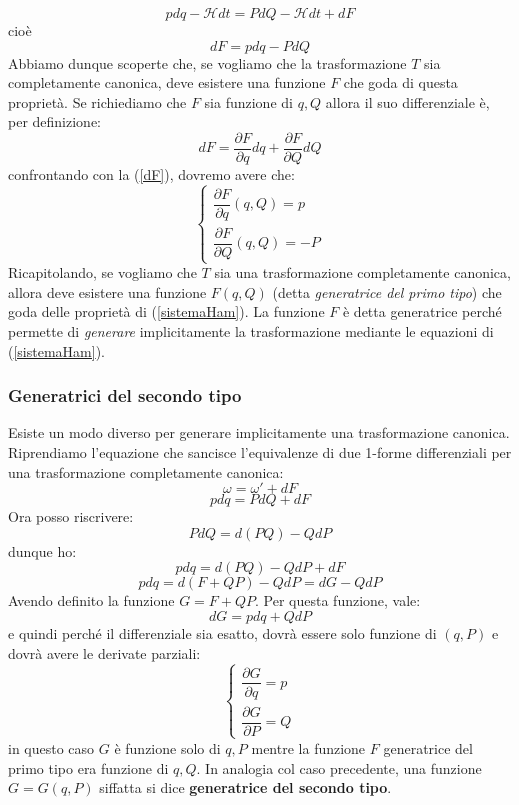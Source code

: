 \documentclass[a4paper,openany]{article}
\begin{document}
	\begin{equation*}\label{key}
		pdq-\mathcal{H}dt = PdQ-\mathcal{H}dt + dF
	\end{equation*}
	cioè
	\begin{equation}
		dF = pdq - PdQ
		\label{dF}
	\end{equation}
	Abbiamo dunque scoperte che, se vogliamo che la trasformazione $T$ sia completamente canonica, deve esistere una funzione $F$ che goda di questa proprietà. Se richiediamo che $F$ sia funzione di $q,Q$ allora il suo differenziale è, per definizione:
	$$
	dF = \dfrac{\partial F}{\partial q}dq+\dfrac{\partial F}{\partial Q}dQ
	$$
	confrontando con la (\ref{dF}), dovremo avere che:
	\begin{equation}
		\begin{cases}
			\dfrac{\partial F}{\partial q}(q,Q)=p \\[8pt]
			\dfrac{\partial F}{\partial Q}(q,Q) = -P
		\end{cases}
		\label{sistemaHam}
	\end{equation}
	Ricapitolando, se vogliamo che $T$ sia una trasformazione completamente canonica, allora deve esistere una funzione $F(q,Q)$ (detta \textit{generatrice del primo tipo}) che goda delle proprietà di (\ref{sistemaHam}). La funzione $F$ è detta generatrice perché permette di \textit{generare} implicitamente la trasformazione mediante le equazioni di (\ref{sistemaHam}).
	\subsubsection{Generatrici del secondo tipo}
	Esiste un modo diverso per generare implicitamente una trasformazione canonica. Riprendiamo l'equazione che sancisce l'equivalenze di due 1-forme differenziali per una trasformazione completamente canonica:
	$$
	\omega = \omega'+dF
	$$
	$$
	pdq = PdQ + dF
	$$
	Ora posso riscrivere:
	$$
	PdQ = d(PQ)-QdP
	$$
	dunque ho:
	$$
	pdq = d(PQ)-QdP +dF
	$$
	$$
	pdq = d(F+QP)-QdP = dG - QdP
	$$
	Avendo definito la funzione $G=F+QP$. Per questa funzione, vale:
	$$
	dG = pdq + QdP
	$$
	e quindi perché il differenziale sia esatto, dovrà essere solo funzione di $(q,P)$ e dovrà avere le derivate parziali:
	\begin{equation}
		\begin{cases}
			\dfrac{\partial G}{\partial q} = p \\[6pt]
			\dfrac{\partial G}{\partial P} = Q
		\end{cases}
		\label{325}
	\end{equation}
	in questo caso $G$ è funzione solo di $q,P$ mentre la funzione $F$ generatrice del primo tipo era funzione di $q,Q$. In analogia col caso precedente, una funzione $G=G(q,P)$ siffatta si dice \textbf{generatrice del secondo tipo}.
	
\end{document}
